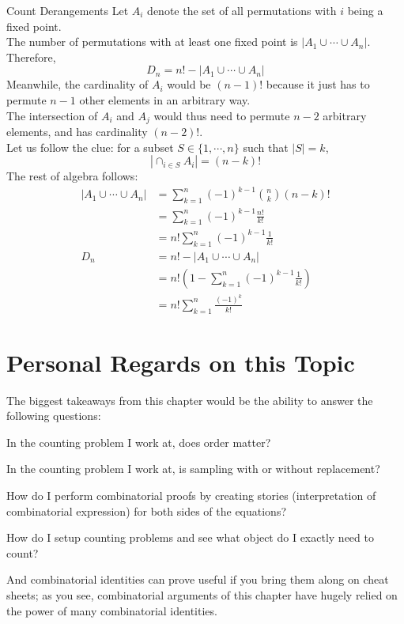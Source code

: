 \begin{ln-quest}{Count Derangements}{}
    Let $A_i$ denote the set of all permutations with $i$ being a fixed point. \\
    The number of permutations with at least one fixed point is $|A_1 \cup \cdots \cup A_n|$. Therefore,
    \[D_n = n! - |A_1 \cup \cdots \cup A_n|\]
    Meanwhile, the cardinality of $A_i$ would be $(n - 1)!$ because it just has to permute $n - 1$ other elements in an arbitrary way. \\
    The intersection of $A_i$ and $A_j$ would thus need to permute $n - 2$ arbitrary elements, and has cardinality $(n - 2)!$. \\
    Let us follow the clue: for a subset $S \in \{1, \cdots, n\}$ such that $|S| = k$,
    \[|\cap_{i \in S} A_i| = (n - k)!\]
    The rest of algebra follows:
    \begin{align*}
        |A_1 \cup \cdots \cup A_n|
        &= \sum_{k = 1}^n {(-1)}^{k - 1} \binom{n}{k} (n - k)! \\
        &= \sum_{k = 1}^n {(-1)}^{k - 1} \frac{n!}{k!} \\
        &= n! \sum_{k = 1}^n {(-1)}^{k - 1} \frac{1}{k!} \\
        D_n
        &= n! - |A_1 \cup \cdots \cup A_n| \\
        &= n! (1 - \sum_{k = 1}^n {(-1)}^{k - 1} \frac{1}{k!}) \\
        &= n! \sum_{k = 1}^n \frac{{(-1)}^{k}}{k!}
    \end{align*}
\end{ln-quest}

\section{Personal Regards on this Topic}
The biggest takeaways from this chapter would be the ability to answer the following questions:
\begin{bindenum}
    \item In the counting problem I work at, does order matter?
    \item In the counting problem I work at, is sampling with or without replacement?
    \item How do I perform combinatorial proofs by creating stories (interpretation of combinatorial expression) for both sides of the equations?
    \item How do I setup counting problems and see what object do I exactly need to count?
\end{bindenum}
And combinatorial identities can prove useful if you bring them along on cheat sheets; as you see, combinatorial arguments of this chapter have hugely relied on the power of many combinatorial identities.
